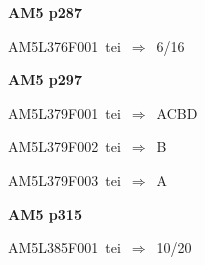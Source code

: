\par\vfill\eject
{\bf\hfill AM5 p287\hfill\hbox{}}\par\bigskip
{\sixrm AM5L376F001\ {\sixit tei}\ }$\Rightarrow$\ 6/16\par\smallskip

\par\vfill\eject
{\bf\hfill AM5 p297\hfill\hbox{}}\par\bigskip
{\sixrm AM5L379F001\ {\sixit tei}\ }$\Rightarrow$\ ACBD\par\smallskip
{\sixrm AM5L379F002\ {\sixit tei}\ }$\Rightarrow$\ B\par\smallskip
{\sixrm AM5L379F003\ {\sixit tei}\ }$\Rightarrow$\ A\par\smallskip

\par\vfill\eject
{\bf\hfill AM5 p315\hfill\hbox{}}\par\bigskip
{\sixrm AM5L385F001\ {\sixit tei}\ }$\Rightarrow$\ 10/20\par\smallskip

